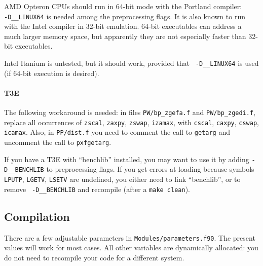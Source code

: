 \documentclass[12pt]{article}
\begin{document}
AMD Opteron CPUs should run in 64-bit mode with the Portland compiler:\\
{\tt -D\_\_LINUX64} is needed among the preprocessing flags. It is also
known to run with the Intel compiler in 32-bit emulation. 64-bit
executables can address a much larger memory space, but apparently they
are not especially faster than 32-bit executables.

Intel Itanium is untested, but it should work, provided that {\tt
-D\_\_LINUX64} is used (if 64-bit execution is desired).

\paragraph{T3E}

The following workaround is needed: in files {\tt PW/bp\_zgefa.f} and
{\tt PW/bp\_zgedi.f}, replace all occurrences of {\tt zscal},
{\tt zaxpy}, {\tt zswap}, {\tt izamax}, with {\tt cscal},
{\tt caxpy}, {\tt cswap}, {\tt icamax}. Also, in {\tt PP/dist.f}
you need to comment the call to {\tt getarg} and uncomment the
call to {\tt pxfgetarg}.

If you have a T3E with ``benchlib'' installed, you may want to use it by
adding {\tt -D\_\_BENCHLIB} to preprocessing flags. If you get errors at
loading because symbols {\tt LPUTP}, {\tt LGETV}, {\tt LSETV} are
undefined, you either need to link ``benchlib'', or to remove {\tt
-D\_\_BENCHLIB} and recompile (after a {\tt make clean}).

\subsection{Compilation}

There are a few adjustable parameters in {\tt Modules/parameters.f90}.
The present values will work for most cases. All other variables are
dynamically allocated: you do not need to recompile your code for a
different system.
\end{document}

